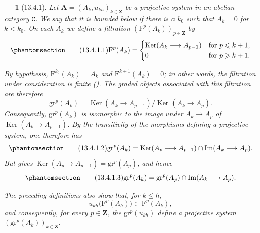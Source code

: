 \documentclass[oneside]{amsart}
\theoremstyle{ega-env-style}
\newtheorem*{env}{---}
\theoremstyle{ega-thm-env-style}
\theoremstyle{ega-defn-env-style}
\def\bb{\mathbf}                    %
\def\cat{\mathtt}                   %
\def\leq{\leqslant}                 %
\def\geq{\geqslant}                 %
\def\Ker{\operatorname{Ker}}
\def\Im{\operatorname{Im}}
\newcommand{\oldpage}[2][]{{\marginnote{\normalfont{\textbf{#1}~|~#2}}}\ignorespaces}
\let\EGAOriginalLabel\label
\renewcommand{\label}[1]{\phantomsection\EGAOriginalLabel{#1}}
\begin{document}
\begin{env}[13.4.1]
\label{0.13.4.1}
Let
$\bb{A}=(A_k,u_{kh})_{k\in\bb{Z}}$ be a projective system in an
abelian category $\cat{C}$.
We say that it is \emph{bounded below} if there is a $k_0$ such that
$A_k=0$ for $k<k_0$.
On each $A_k$ we define a \emph{filtration}
$(\mathrm{F}^p(A_k))_{p\in\bb{Z}}$ by
\begin{equation}
\label{0.13.4.1.1}
\tag{13.4.1.1}
  \mathrm{F}^p(A_k)=
  \begin{cases}
    \Ker(A_k\longrightarrow A_{p-1}) & \text{for }p\leq k+1,\\
    0 & \text{for }p\geq k+1.
  \end{cases}
\end{equation}

\oldpage[0\textsubscript{III}]{70}
By hypothesis,
$\mathrm{F}^{k_0}(A_k)=A_k$ and
$\mathrm{F}^{k+1}(A_k)=0$; in other words, the filtration under
consideration is finite ().
The graded objects associated with this filtration are therefore
\[
  \mathrm{gr}^p(A_k)
  =
  \Ker(A_k\longrightarrow A_{p-1})
  \big/
  \Ker(A_k\longrightarrow A_p).
\]
Consequently, $\mathrm{gr}^p(A_k)$ is isomorphic to the image under
$A_k\longrightarrow A_p$ of
$\Ker(A_k\longrightarrow A_{p-1})$.
By the transitivity of the morphisms defining a projective system,
one therefore has
\begin{equation}
\label{0.13.4.1.2}
\tag{13.4.1.2}
  \mathrm{gr}^p(A_k)
  =
  \Ker(A_p\longrightarrow A_{p-1})
  \cap
  \Im(A_k\longrightarrow A_p).
\end{equation}
But  gives
$\Ker(A_p\longrightarrow A_{p-1})=\mathrm{gr}^p(A_p)$, and hence
\begin{equation}
\label{0.13.4.1.3}
\tag{13.4.1.3}
  \mathrm{gr}^p(A_k)
  =
  \mathrm{gr}^p(A_p)
  \cap
  \Im(A_k\longrightarrow A_p).
\end{equation}

The preceding definitions also show that, for $k\leq h$,
\[
  u_{kh}\bigl(\mathrm{F}^p(A_h)\bigr)
  \subset
  \mathrm{F}^p(A_k),
\]
and consequently, for every $p\in\bb{Z}$, the
$\mathrm{gr}^p(u_{kh})$ define a projective system
$(\mathrm{gr}^p(A_k))_{k\in\bb{Z}}$.
\end{env}
\end{document}
